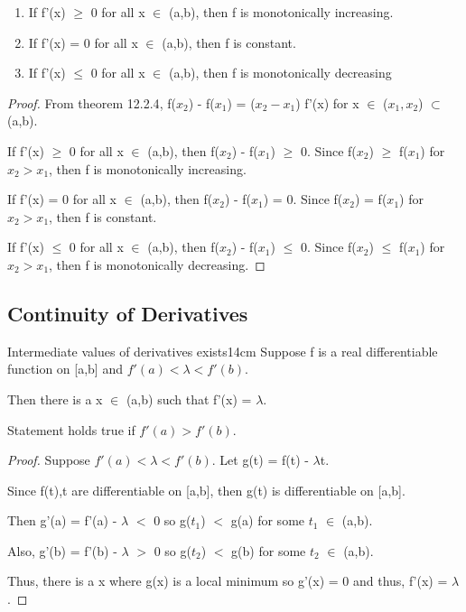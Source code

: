     \begin{enumerate}[label=(\alph*), leftmargin=1cm, itemsep=0.1cm]
        \item If f'(x) $\geq$ 0 for all x $\in$ (a,b), then f is monotonically
        increasing.

        \item If f'(x) = 0 for all x $\in$ (a,b), then f is constant.
        
        \item If f'(x) $\leq$ 0 for all x $\in$ (a,b), then f is monotonically
        decreasing
    \end{enumerate}

    \begin{proof}
        From {\color{red} theorem 12.2.4}, f($x_2$) - f($x_1$) = ($x_2 - x_1$) f'(x)
        for x $\in$ ($x_1,x_2$) $\subset$ (a,b).

        If f'(x) $\geq$ 0 for all x $\in$ (a,b), then f($x_2$) - f($x_1$) $\geq$ 0.
        Since f($x_2$) $\geq$ f($x_1$) for $x_2 > x_1$, then f is monotonically
        increasing.

        If f'(x) = 0 for all x $\in$ (a,b), then f($x_2$) - f($x_1$) = 0.
        Since f($x_2$) = f($x_1$) for $x_2 > x_1$, then f is constant.

        If f'(x) $\leq$ 0 for all x $\in$ (a,b), then f($x_2$) - f($x_1$) $\leq$ 0.
        Since f($x_2$) $\leq$ f($x_1$) for $x_2 > x_1$, then f is monotonically
        decreasing.
    \end{proof}

    \vspace{0.5cm}





\subsection{ Continuity of Derivatives }

    \begin{wtheorem}{Intermediate values of derivatives exists}{14cm}
        Suppose f is a real differentiable function on [a,b]
        and $f'(a) < \lambda < f'(b)$.

        Then there is a x $\in$ (a,b) such that f'(x) = $\lambda$.

        Statement holds true if $f'(a) > f'(b)$.        
    \end{wtheorem}

    \begin{proof}
        Suppose $f'(a) < \lambda < f'(b)$.
        Let g(t) = f(t) - $\lambda$t.

        Since f(t),t are differentiable on [a,b],
        then g(t) is differentiable on [a,b].

        Then g'(a) = f'(a) - $\lambda$ $<$ 0 so g($t_1$) $<$ g(a)
        for some $t_1$ $\in$ (a,b).

        Also, g'(b) = f'(b) - $\lambda$ $>$ 0 so g($t_2$) $<$ g(b)
        for some $t_2$ $\in$ (a,b).

        Thus, there is a x where g(x) is a local minimum
        so g'(x) = 0 and thus, f'(x) = $\lambda$.
    \end{proof}

